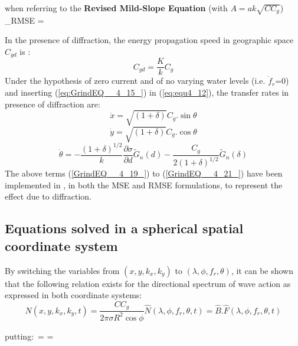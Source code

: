when referring to the \textbf{Revised Mild-Slope Equation} \cite{Porter2003}
(with $A=ak\sqrt{CC_g}$)
\bequ
\label{eq:GrindEQ__4_17_}
\delta _{RMSE} = 
\eequ

In the presence of diffraction, the energy propagation speed in geographic
space $C_{gd}$ is \cite{Holthuijsen2003}:
\begin{equation} \label{GrindEQ__4_18_}
C_{gd} =\frac{K}{k} C_g
\end{equation}
Under the hypothesis of zero current and of no varying water levels (i.e.
$\dot{f}_r $=0) and inserting (\ref{eq:GrindEQ__4_15_}) in (\ref{eq:equ4_12}),
the transfer rates in presence of diffraction are:
\begin{equation} \label{GrindEQ__4_19_}
\dot{x}=\sqrt{(1+\delta )} C_g .\sin \theta
\end{equation}
\begin{equation} \label{GrindEQ__4_20_}
\dot{y}=\sqrt{(1+\delta )} C_g .\cos \theta
\end{equation}
\begin{equation} \label{GrindEQ__4_21_}
  \dot{\theta }=-\frac{(1+\delta )^{1/2} }{k} \frac{\partial \sigma }{\partial d}
  \tilde{G}_n (d)-\frac{C_g }{2(1+\delta )^{1/2} } \tilde{G}_n (\delta )
\end{equation}
The above terms (\ref{GrindEQ__4_19_}) to (\ref{GrindEQ__4_21_}) have been
implemented in \tomawac, in both the MSE and RMSE formulations, to represent
the effect due to diffraction.


\subsection{ Equations solved in a spherical spatial coordinate system}

By switching the variables from $(x, y, k_x, k_y)$ to $(\lambda, \phi, f_r,
\theta)$, it can be shown that the following relation exists for the
directional spectrum of wave action as expressed in both coordinate systems:
\begin{equation} \label{GrindEQ__4_22_}
  N(x,y,k_x ,k_y ,t)=\frac{CC_g }{2\pi \sigma R^{2} \cos \phi } \hat{N}(\lambda ,
  \phi ,f_{r} ,\theta ,t)=\hat{B}.\hat{F}(\lambda ,\phi ,f_r ,\theta ,t)
\end{equation}

\bequ
\label{eq:GrindEQ__4_23}
\mbox{putting: }=
=  
\eequ

